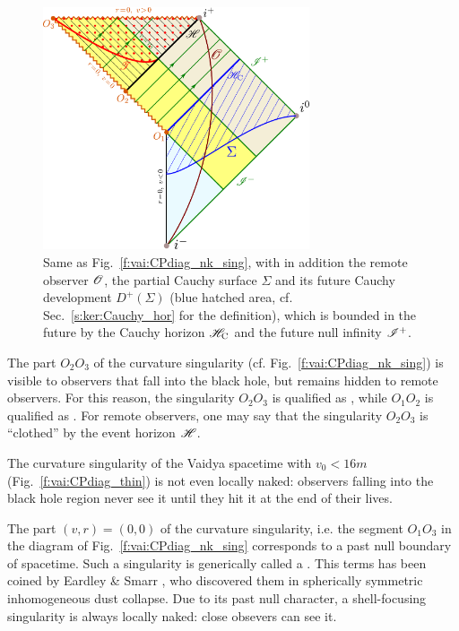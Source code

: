 \begin{figure}
\centerline{\includegraphics[width=0.7\textwidth]{vai_CPdiag_Cauchy.pdf}}
\caption[]{\label{f:vai:CPdiag_Cauchy} \footnotesize
Same as Fig.~\ref{f:vai:CPdiag_nk_sing}, with in addition the remote
observer $\mathscr{O}$, the partial Cauchy surface $\Sigma$ and its future Cauchy development $D^+(\Sigma)$ (blue hatched area, cf. Sec.~\ref{s:ker:Cauchy_hor} for the definition), which is bounded in the future by
the Cauchy horizon $\mathscr{H}_{\rm C}$ and the future null infinity $\mathscr{I}^+$.}
\end{figure}

\begin{remark}
The part $O_2 O_3$ of the curvature singularity (cf. Fig.~\ref{f:vai:CPdiag_nk_sing})
is visible to observers that fall into the black hole, but remains hidden
to remote observers. For this reason, the singularity $O_2 O_3$ is qualified as
,
while $O_1 O_2$ is qualified as
.
For remote observers, one may say that the
singularity $O_2 O_3$ is ``clothed'' by the event horizon $\mathscr{H}$.
\end{remark}

\begin{remark}
The curvature singularity of the Vaidya spacetime with $v_0 < 16 m$ (Fig.~\ref{f:vai:CPdiag_thin})
is not even locally naked: observers falling into the black hole region never see
it until they hit it at the end of their lives.
\end{remark}

The part  $(v, r) = (0, 0)$ of the curvature singularity, i.e. the segment $O_1 O_3$ in
the diagram of Fig.~\ref{f:vai:CPdiag_nk_sing} corresponds to a past null boundary of
spacetime.
Such a singularity is generically called a
. This terms has been coined by Eardley \& Smarr \cite{EardlS79}, who discovered them
in spherically symmetric inhomogeneous dust collapse.
Due to its past null character, a shell-focusing singularity is always locally naked: close obsevers can see it.



